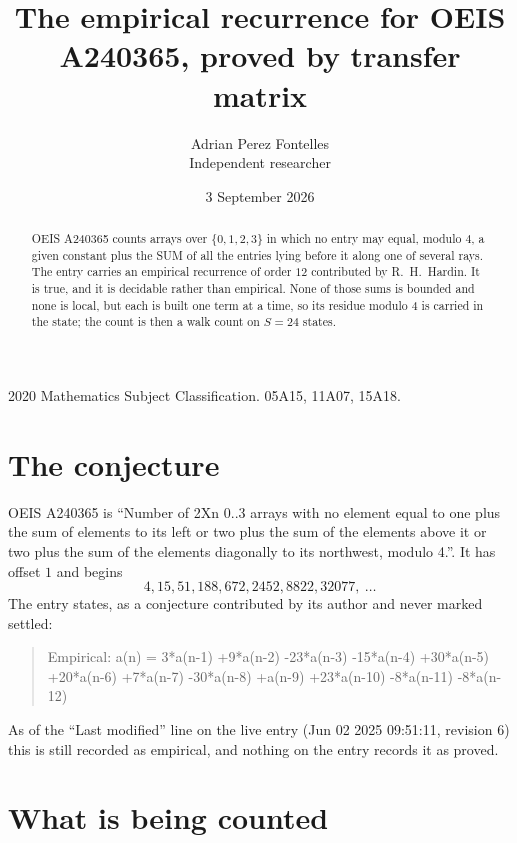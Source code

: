 \documentclass[11pt,a4paper]{article}
\title{The empirical recurrence for OEIS A240365, proved by transfer matrix}
\author{Adrian Perez Fontelles\\ \small Independent researcher}
\date{3 September 2026}
\theoremstyle{plain}
\theoremstyle{definition}
\begin{document}
\maketitle

\begin{abstract}
OEIS A240365 counts arrays over $\{0,1,2,3\}$ in which no entry may equal, modulo $4$, a given
constant plus the SUM of all the entries lying before it along one of several rays. The entry
carries an empirical recurrence of order $12$ contributed by R.~H.~Hardin. It is true, and
it is decidable rather than empirical. None of those sums is bounded and none is local, but
each is built one term at a time, so its residue modulo $4$ is carried in the state; the
count is then a walk count on $S=24$ states.
\end{abstract}

\noindent\small 2020 Mathematics Subject Classification. 05A15, 11A07, 15A18.\normalsize

\section{The conjecture}

OEIS A240365 is ``Number of 2Xn 0..3 arrays with no element equal to one plus the sum of elements to its left or two plus the sum of the elements above it or two plus the sum of the elements diagonally to its northwest, modulo 4.''. It has offset $1$ and begins
\[
4, 15, 51, 188, 672, 2452, 8822, 32077,\ \dots
\]
The entry states, as a conjecture contributed by its author and never marked settled:
\begin{quote}
Empirical: a(n) = 3*a(n-1) +9*a(n-2) -23*a(n-3) -15*a(n-4) +30*a(n-5) +20*a(n-6) +7*a(n-7) -30*a(n-8) +a(n-9) +23*a(n-10) -8*a(n-11) -8*a(n-12)
\end{quote}
As of the ``Last modified'' line on the live entry (Jun 02 2025 09:51:11, revision 6) this is still
recorded as empirical, and nothing on the entry records it as proved.

\section{What is being counted}
\end{document}
